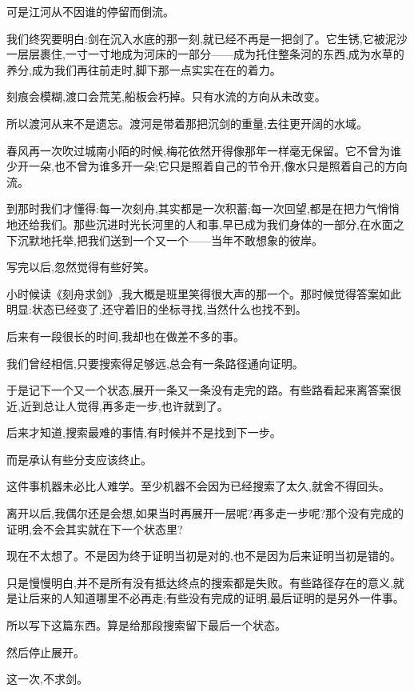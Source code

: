 \documentclass[UTF8, fontset=fandol, 12pt]{ctexart}
\newcommand{\dan}[1]{{\color{black!55}#1}}
\newcommand{\huanqi}{\par\vspace{2.1em}}
\begin{document}
\huanqi

可是江河从不因谁的停留而倒流。

我们终究要明白:剑在沉入水底的那一刻,就已经不再是一把剑了。它生锈,它被泥沙一层层裹住,一寸一寸地成为河床的一部分——成为托住整条河的东西,成为水草的养分,成为我们再往前走时,脚下那一点实实在在的着力。

刻痕会模糊,渡口会荒芜,船板会朽掉。只有水流的方向从未改变。

\huanqi

所以渡河从来不是遗忘。渡河是带着那把沉剑的重量,去往更开阔的水域。

春风再一次吹过城南小陌的时候,梅花依然开得像那年一样毫无保留。它不曾为谁少开一朵,也不曾为谁多开一朵;它只是照着自己的节令开,像水只是照着自己的方向流。

到那时我们才懂得:每一次刻舟,其实都是一次积蓄;每一次回望,都是在把力气悄悄地还给我们。那些沉进时光长河里的人和事,早已成为我们身体的一部分,在水面之下沉默地托举,把我们送到一个又一个——当年不敢想象的彼岸。

\newpage

\vspace*{1.0em}

\noindent{\color{black!35}\rule{4.5em}{0.4pt}}

\vspace{0.8em}

{\linespread{1.5}\selectfont
\setlength{\parskip}{0.38em}

\noindent\dan{后\,记}

\vspace{0.6em}

写完以后,忽然觉得有些好笑。

小时候读《刻舟求剑》,我大概是班里笑得很大声的那一个。那时候觉得答案如此明显:状态已经变了,还守着旧的坐标寻找,当然什么也找不到。

后来有一段很长的时间,我却也在做差不多的事。

我们曾经相信,只要搜索得足够远,总会有一条路径通向证明。

于是记下一个又一个状态,展开一条又一条没有走完的路。有些路看起来离答案很近,近到总让人觉得,再多走一步,也许就到了。

后来才知道,搜索最难的事情,有时候并不是找到下一步。

而是承认有些分支应该终止。

这件事机器未必比人难学。至少机器不会因为已经搜索了太久,就舍不得回头。

离开以后,我偶尔还是会想,如果当时再展开一层呢?再多走一步呢?那个没有完成的证明,会不会其实就在下一个状态里?

\newpage

现在不太想了。不是因为终于证明当初是对的,也不是因为后来证明当初是错的。

只是慢慢明白,并不是所有没有抵达终点的搜索都是失败。有些路径存在的意义,就是让后来的人知道哪里不必再走;有些没有完成的证明,最后证明的是另外一件事。

所以写下这篇东西。算是给那段搜索留下最后一个状态。

然后停止展开。

\vspace{0.5em}

这一次,不求剑。

}
\end{document}
